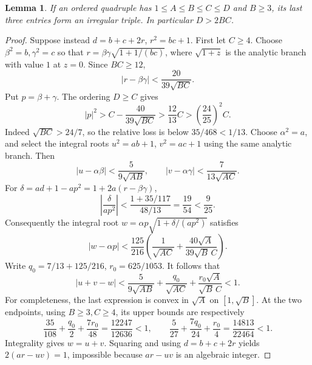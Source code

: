 \documentclass[12pt]{article}
\newtheorem{lemma}[theorem]{Lemma}
\numberwithin{equation}{section}
\begin{document}
\begin{lemma}\label{lem:tail-irregular}
If an ordered quadruple has \(1\le A\le B\le C\le D\) and \(B\ge3\),
its last three entries form an irregular triple. In particular \(D>2BC\).
\end{lemma}
\begin{proof}
Suppose instead \(d=b+c+2r\), \(r^2=bc+1\). First let \(C\ge4\).
Choose \(\beta^2=b,\gamma^2=c\) so that
\(r=\beta\gamma\sqrt{1+1/(bc)}\), where \(\sqrt{1+z}\) is the
analytic branch with value \(1\) at \(z=0\).
Since \(BC\ge12\),
\[
 |r-\beta\gamma|<\frac{20}{39\sqrt{BC}}.
\]
Put \(p=\beta+\gamma\). The ordering \(D\ge C\) gives
\[
 |p|^2>C-\frac{40}{39\sqrt{BC}}>
 \frac{12}{13}C>\left(\frac{24}{25}\right)^2C.
\]
Indeed \(\sqrt{BC}>24/7\), so the relative loss is below
\(35/468<1/13\).
Choose \(\alpha^2=a\), and select the integral roots \(u^2=ab+1\),
\(v^2=ac+1\) using the same analytic branch. Then
\[
 |u-\alpha\beta|<\frac5{9\sqrt{AB}},\qquad
 |v-\alpha\gamma|<\frac7{13\sqrt{AC}}.
\]
For \(\delta=ad+1-ap^2=1+2a(r-\beta\gamma)\),
\[
 \left|\frac{\delta}{ap^2}\right|
 <\frac{1+35/117}{48/13}=\frac{19}{54}<\frac9{25}.
\]
Consequently the integral root
\(w=\alpha p\sqrt{1+\delta/(ap^2)}\) satisfies
\[
 |w-\alpha p|<
 \frac{125}{216}\left(\frac1{\sqrt{AC}}
       +\frac{40\sqrt A}{39\sqrt B\,C}\right).
\]
Write \(q_0=7/13+125/216\), \(r_0=625/1053\). It follows that
\[
 |u+v-w|<
 \frac5{9\sqrt{AB}}+\frac{q_0}{\sqrt{AC}}
                    +\frac{r_0\sqrt A}{\sqrt B\,C}<1.
\]
For completeness, the last expression is convex in \(\sqrt A\)
on \([1,\sqrt B]\). At the two endpoints, using \(B\ge3,C\ge4\),
its upper bounds are respectively
\[
 \frac{35}{108}+\frac{q_0}{2}+\frac{7r_0}{48}
   =\frac{12247}{12636}<1,\qquad
 \frac5{27}+\frac{7q_0}{24}+\frac{r_0}{4}
   =\frac{14813}{22464}<1.
\]
Integrality gives \(w=u+v\). Squaring and using
\(d=b+c+2r\) yields \(2(ar-uv)=1\), impossible because
\(ar-uv\) is an algebraic integer.


\end{proof}
\end{document}
